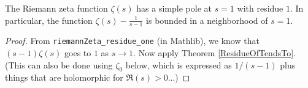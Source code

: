 \begin{theorem}[riemannZetaResidue]
\label{riemannZetaResidue}
\leanok
The Riemann zeta function $\zeta(s)$ has a simple pole at $s=1$ with residue $1$. In particular,
  the function $\zeta(s) - \frac{1}{s-1}$ is bounded in a neighborhood of $s=1$.
\end{theorem}
\begin{proof}
\leanok
From \texttt{riemannZeta\_residue\_one} (in Mathlib), we know that
  $(s-1)\zeta(s)$ goes to $1$ as $s\to1$. Now apply Theorem \ref{ResidueOfTendsTo}.
  (This can also be done using $\zeta_0$ below, which is expressed as
  $1/(s-1)$ plus things that are holomorphic for $\Re(s)>0$...)
\end{proof}
